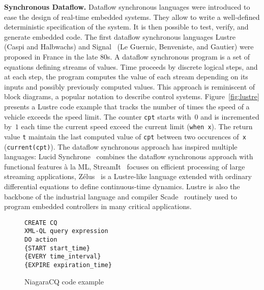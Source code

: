 \textbf{Synchronous Dataflow.}
Dataflow synchronous languages were introduced to ease the design of
real-time embedded systems. They allow to write a well-defined
deterministic specification of the system. It is then possible to
test, verify, and generate embedded code.
The first dataflow synchronous languages Lustre~\cite{lustre_1987}
(Caspi and Halbwachs) and Signal~\cite{signal_1991} (Le Guernic,
Benveniste, and Gautier) were proposed in France in the late 80s.
A dataflow synchronous program is a set of equations defining streams
of values. Time proceeds by discrete logical steps, and at each step,
the program computes the value of each stream depending on its inputs
and possibly previously computed values.
This approach is reminiscent of block diagrams, a popular notation to
describe control systems.
Figure~\ref{fig:lustre} presents a Lustre code example that tracks the
number of times the speed of a vehicle exceeds the speed limit. The
counter \lstinline{cpt} starts with~$0$ and is incremented by~$1$ each
time the current speed exceed the current limit (\lstinline{when x}).
The return value \lstinline{t} maintain the last computed value
of \lstinline{cpt} between two occurences of~\lstinline{x}
(\lstinline{current(cpt)}).
The dataflow synchronous approach has inspired
multiple languages: Lucid Synchrone~\cite{lucid_2006} combines the
dataflow synchronous approach with functional features \`a la ML,
StreamIt~\cite{streamit_2002} focuses on efficient processing of large
streaming applications, Z\'elus~\cite{zelus_2013} is a Lustre-like
language extended with ordinary differential equations to define
continuous-time dynamics. Lustre is also the backbone of the
industrial language and compiler Scade~\cite{scade_2017} routinely
used to program embedded controllers in many critical applications.


\begin{figure}[!h]
\begin{lstlisting}
CREATE CQ
XML-QL query expression
DO action
{START start_time}
{EVERY time_interval}
{EXPIRE expiration_time}
\end{lstlisting}
\caption{\label{fig:Niagra}NiagaraCQ code example}
\end{figure}

